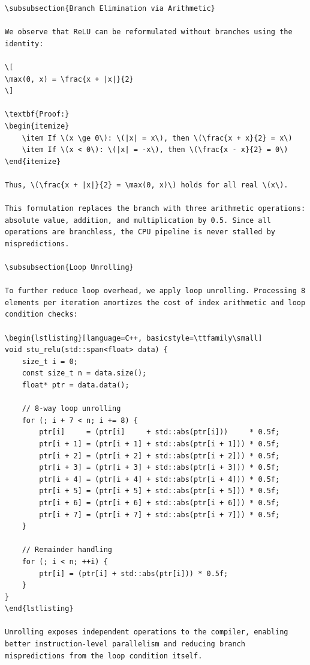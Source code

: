 \documentclass[11pt, a4paper]{article}
\begin{document}
\begin{aibox}
\begin{tcolorbox}[colback=white,colframe=gray!50!white,boxrule=0.5pt,arc=2pt,left=5pt,right=5pt,top=5pt,bottom=5pt]
\begin{verbatim}
\subsubsection{Branch Elimination via Arithmetic}

We observe that ReLU can be reformulated without branches using the identity:

\[
\max(0, x) = \frac{x + |x|}{2}
\]

\textbf{Proof:}
\begin{itemize}
    \item If \(x \ge 0\): \(|x| = x\), then \(\frac{x + x}{2} = x\)
    \item If \(x < 0\): \(|x| = -x\), then \(\frac{x - x}{2} = 0\)
\end{itemize}

Thus, \(\frac{x + |x|}{2} = \max(0, x)\) holds for all real \(x\).

This formulation replaces the branch with three arithmetic operations: absolute value, addition, and multiplication by 0.5. Since all operations are branchless, the CPU pipeline is never stalled by mispredictions.

\subsubsection{Loop Unrolling}

To further reduce loop overhead, we apply loop unrolling. Processing 8 elements per iteration amortizes the cost of index arithmetic and loop condition checks:

\begin{lstlisting}[language=C++, basicstyle=\ttfamily\small]
void stu_relu(std::span<float> data) {
    size_t i = 0;
    const size_t n = data.size();
    float* ptr = data.data();
    
    // 8-way loop unrolling
    for (; i + 7 < n; i += 8) {
        ptr[i]     = (ptr[i]     + std::abs(ptr[i]))     * 0.5f;
        ptr[i + 1] = (ptr[i + 1] + std::abs(ptr[i + 1])) * 0.5f;
        ptr[i + 2] = (ptr[i + 2] + std::abs(ptr[i + 2])) * 0.5f;
        ptr[i + 3] = (ptr[i + 3] + std::abs(ptr[i + 3])) * 0.5f;
        ptr[i + 4] = (ptr[i + 4] + std::abs(ptr[i + 4])) * 0.5f;
        ptr[i + 5] = (ptr[i + 5] + std::abs(ptr[i + 5])) * 0.5f;
        ptr[i + 6] = (ptr[i + 6] + std::abs(ptr[i + 6])) * 0.5f;
        ptr[i + 7] = (ptr[i + 7] + std::abs(ptr[i + 7])) * 0.5f;
    }
    
    // Remainder handling
    for (; i < n; ++i) {
        ptr[i] = (ptr[i] + std::abs(ptr[i])) * 0.5f;
    }
}
\end{lstlisting}

Unrolling exposes independent operations to the compiler, enabling better instruction-level parallelism and reducing branch mispredictions from the loop condition itself.
\end{verbatim}
\end{tcolorbox}
\end{aibox}
\end{document}
